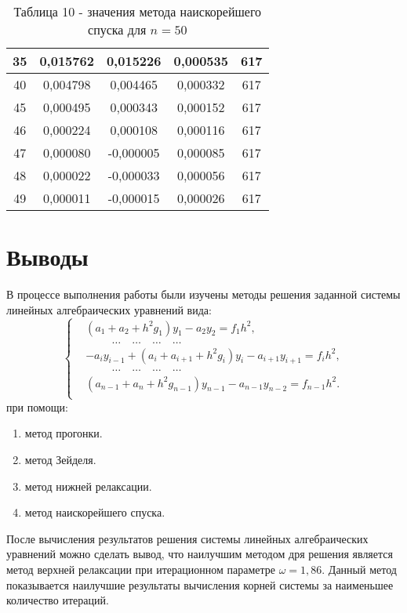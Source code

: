 \documentclass[a4paper,12pt]{article}
\begin{document}
{\begin{table}[h]
\begin{tabular}{|c|c|c|c|c|}
       35 &  0,015762 &  0,015226 &  0,000535 & 617 \\ \hline
       40 &  0,004798 &  0,004465 &  0,000332 & 617 \\ \hline
       45 &  0,000495 &  0,000343 &  0,000152 & 617 \\ \hline
       46 &  0,000224 &  0,000108 &  0,000116 & 617 \\ \hline
       47 &  0,000080 & -0,000005 &  0,000085 & 617 \\ \hline
       48 &  0,000022 & -0,000033 &  0,000056 & 617 \\ \hline
       49 &  0,000011 & -0,000015 &  0,000026 & 617 \\ \hline
    \end{tabular}
    \caption*{\small{Таблица 10 - значения метода наискорейшего спуска для $n = 50$}}
\end{table}
\clearpage
\section{Выводы}
\hspace{1.25cm}В процессе выполнения работы были изучены методы решения заданной системы линейных алгебраических уравнений вида:
\begin{equation*}
    \begin{cases}
        &(a_1 + a_2 + h^2g_1)y_1 - a_2y_2 = f_1h^2,\\
        &\hspace{1cm}\dots \quad \dots \quad \dots \quad \dots\\
        &-a_iy_{i-1} + (a_i + a_{i+1} + h^2g_i)y_i - a_{i+1}y_{i+1} = f_ih^2,\\
        &\hspace{1cm}\dots \quad \dots \quad \dots \quad \dots\\
        &(a_{n-1} + a_{n} + h^2g_{n-1})y_{n-1} - a_{n-1}y_{n-2} = f_{n-1}h^2.\\
    \end{cases}
\end{equation*}
при помощи:
\begin{enumerate}[label = \arabic*.]
    \item метод прогонки.
    \item метод Зейделя.
    \item метод нижней релаксации.
    \item метод наискорейшего спуска.
\end{enumerate}

После вычисления результатов решения системы линейных алгебраических уравнений можно сделать вывод, 
что наилучшим методом дря решения является метод верхней релакса\-ции при итерационном параметре $\omega = 1,86$. 
Данный метод показывается наилучшие результа\-ты вычисления корней системы за наименьшее количество итераций.
}
\clearpage
\end{document}
